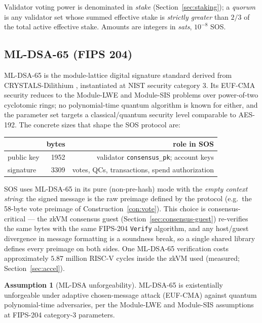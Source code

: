 \documentclass[11pt]{article}
\newcommand{\code}[1]{\texttt{#1}}
\newcommand{\mldsa}{ML\mbox{-}DSA\mbox{-}65}
\theoremstyle{plain}
\theoremstyle{definition}
\newtheorem{assumption}{Assumption}
\theoremstyle{remark}
\begin{document}
Validator voting power is denominated in \emph{stake} (Section~\ref{sec:staking});
a \emph{quorum} is any validator set whose summed effective stake is
\emph{strictly greater} than $2/3$ of the total active effective stake. Amounts
are integers in \emph{sats}, $10^{-8}$ SOS.

\subsection{ML-DSA-65 (FIPS 204)}
\label{sec:mldsa}

\mldsa{} is the module-lattice digital signature standard \cite{fips204}
derived from CRYSTALS-Dilithium \cite{dilithium2018}, instantiated at NIST
security category 3. Its EUF-CMA security reduces to the Module-LWE and
Module-SIS problems over power-of-two cyclotomic rings; no polynomial-time
quantum algorithm is known for either, and the parameter set targets a
classical/quantum security level comparable to AES-192. The concrete sizes
that shape the SOS protocol are:

\begin{center}
\begin{tabular}{@{}lrr@{}}
\toprule
 & \textbf{bytes} & \textbf{role in SOS} \\
\midrule
public key            & 1952 & validator \code{consensus\_pk}; account keys \\
signature             & 3309 & votes, QCs, transactions, spend authorization \\
\bottomrule
\end{tabular}
\end{center}

SOS uses \mldsa{} in its pure (non-pre-hash) mode with the \emph{empty
context string}: the signed message is the raw preimage defined by the
protocol (e.g.\ the 58-byte vote preimage of Construction~\ref{con:vote}).
This choice is consensus-critical --- the zkVM consensus guest
(Section~\ref{sec:consensus-guest}) re-verifies the same bytes with the same
FIPS-204 \code{Verify} algorithm, and any host/guest divergence in message
formatting is a soundness break, so a single shared library defines every
preimage on both sides. One \mldsa{} verification costs approximately $5.87$
million RISC-V cycles inside the zkVM used (measured;
Section~\ref{sec:accel}).

\begin{assumption}[ML-DSA unforgeability]
\label{ass:mldsa}
\mldsa{} is existentially unforgeable under adaptive chosen-message attack
(EUF-CMA) against quantum polynomial-time adversaries, per the Module-LWE and
Module-SIS assumptions at FIPS-204 category-3 parameters.
\end{assumption}
\end{document}
